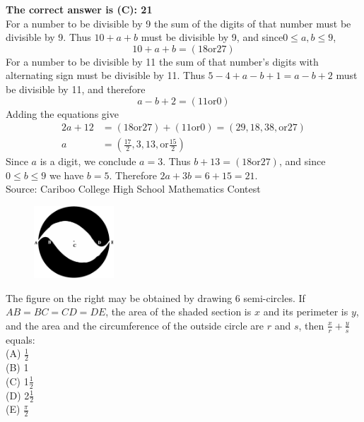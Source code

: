\documentclass{article}
\begin{document}

\textbf{The correct answer is (C): 21}\\[1 ex]
For a number to be divisible by 9 the sum of the digits of that number must be divisible by 9. Thus $10+a+b$ must be divisible by 9, and since$0\leq a,b\leq9$,
\begin{equation*}
10+a+b=(18\textrm{or}27)
\end{equation*}
For a number to be divisible by 11 the sum of that number's digits with alternating sign must be divisible by 11. Thus $5-4+a-b+1=a-b+2$ must be divisible by 11, and therefore
\begin{equation*}
a-b+2=(11\textrm{or}0)
\end{equation*}
Adding the equations give
\begin{align*}
2a+12&=(18\textrm{or}27)+(11\textrm{or}0)=(29,18,38,\textrm{or}27)\\
a&=(\frac{17}{2},3,13,\textrm{or}\frac{15}{2})
\end{align*}
Since $a$ is a digit, we conclude $a=3$. Thus $b+13=(18\textrm{or}27)$, and since $0\leq b\leq9$ we have $b=5$. Therefore $2a+3b=6+15=21$.
\\[5 ex]

\scriptsize
Source: Cariboo College High School Mathematics Contest

\normalsize
\begin{figure}
	\includegraphics[width=30mm,viewport=16 80 533 545]{CCFR74-7pic.eps}
\end{figure}
The figure on the right may be obtained by drawing 6 semi-circles. If $AB=BC=CD=DE$, the area of the shaded section is $x$ and its perimeter is $y$, and the area and the circumference of the outside circle are $r$ and $s$, then $\frac{x}{r}+\frac{y}{s}$ equals:\\
(A) $\frac{1}{2}$\\
(B) 1\\
(C) 1$\frac{1}{2}$\\
(D) 2$\frac{1}{2}$\\
(E) $\frac{\pi}{2}$\\
\end{document}
